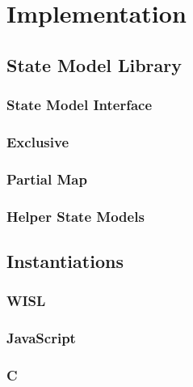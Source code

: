 \chapter{Implementation}

\section{State Model Library}

\subsection{State Model Interface}

\subsection{Exclusive}

\subsection{Partial Map}

\subsection{Helper State Models}

\section{Instantiations}

\subsection{WISL}

\subsection{JavaScript}

\subsection{C}

